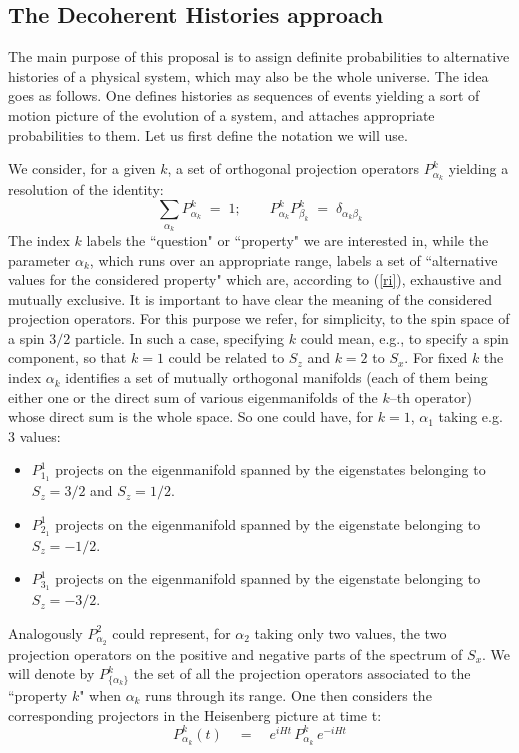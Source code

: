 \documentclass[12pt]{article}
\begin{document}
\subsection{The Decoherent Histories approach} \label{sec35}

The main purpose of this proposal \cite{gri1,gri2,omn1,omn2,gel1}
is to assign definite probabilities to alternative histories of a
physical system, which may also be the whole universe. The idea
goes as follows. One defines histories as sequences of events
yielding a sort of motion picture of the evolution of a system,
and attaches appropriate probabilities to them. Let us first
define the notation we will use.

We consider, for a given $k$, a set of orthogonal projection
operators $P^{k}_{\alpha_{k}}$ yielding a resolution of the
identity:
\begin{equation} \label{ri}
\sum_{\alpha_{k}} P^{k}_{\alpha_{k}} \; = \; 1; \qquad
P^{k}_{\alpha_{k}} P^{k}_{\beta_{k}} \; = \;
\delta_{\alpha_{k}\beta_{k}}
\end{equation}
The index $k$ labels the ``question" or ``property" we are
interested in, while the parameter $\alpha_{k}$, which runs over
an appropriate range, labels a set of ``alternative values for the
considered property" which are, according to (\ref{ri}),
exhaustive and mutually exclusive. It is important to have clear
the meaning of the considered projection operators. For this
purpose we refer, for simplicity, to the spin space of a spin
$3/2$ particle. In such a case, specifying $k$ could mean, e.g.,
to specify a spin component, so that $k=1$ could be related to
$S_{z}$ and $k=2$ to $S_{x}$. For fixed $k$ the index $\alpha_{k}$
identifies  a set of mutually orthogonal manifolds (each of them
being either one or the direct sum of various eigenmanifolds of
the $k$--th operator) whose direct sum is the whole space. So one
could have, for $k=1$, $\alpha_{1}$ taking e.g. $3$ values:
\begin{itemize}
\item $P^{1}_{1_{1}}$ projects on the eigenmanifold spanned by the
eigenstates belonging to $S_{z} = 3/2$ and $S_{z} = 1/2$.
\item $P^{1}_{2_{1}}$ projects on the eigenmanifold spanned by the
eigenstate belonging to $S_{z} = -1/2$.
\item $P^{1}_{3_{1}}$ projects on the eigenmanifold spanned by the
eigenstate belonging to $S_{z} = -3/2$.
\end{itemize}
Analogously $P^{2}_{\alpha_{2}}$ could represent, for $\alpha_{2}$
taking only two values, the two projection operators on the
positive and negative parts of the spectrum of $S_{x}$. We will
denote by $P^{k}_{\{\alpha_{k}\}}$ the set of all the projection
operators associated to the ``property $k$"  when
$\alpha_{k}$ runs through its range. One then considers the corresponding
projectors in the Heisenberg picture at time t:
\begin{equation}
P^{k}_{\alpha_{k}}(t) \quad = \quad e^{iHt}\, P^{k}_{\alpha_{k}}\,
e^{-iHt}
\end{equation}
\end{document}
